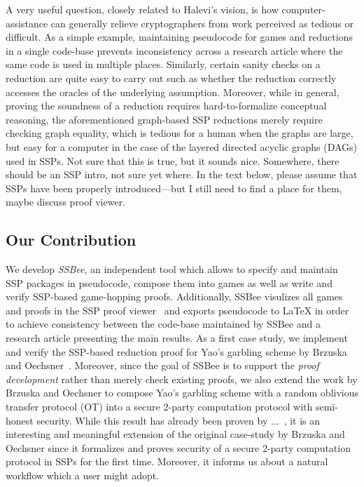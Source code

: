 {A very useful question, closely related to Halevi's vision, is how
computer-assistance can generally relieve cryptographers from work perceived 
as tedious or difficult. %
As a simple example, maintaining pseudocode for games and reductions in a single 
code-base prevents inconsistency across a research article where the same code
is used in multiple places. Similarly, certain sanity checks on a reduction
are quite easy to carry out such as whether the reduction correctly accesses the
oracles of the underlying assumption. Moreover, while in general, proving the soundness of a reduction requires hard-to-formalize conceptual reasoning, the aforementioned graph-based SSP reductions merely require checking graph equality,
which is tedious for a human when the graphs are large, but easy for a computer in the case of the layered directed acyclic graphs (DAGs) used in SSPs. {\color{blue} Not sure that this is true, but it sounds nice. Somewhere, there should be an SSP intro, not sure yet where. In the text below, please assume that SSPs have been properly introduced---but I still need to find a place for them, maybe discuss proof viewer.}
\fi

\subsection{Our Contribution}
We develop \emph{SSBee}, an independent tool which allows to specify and maintain
SSP packages in pseudocode, compose them into games as well as write and verify
SSP-based game-hopping proofs. Additionally, SSBee visulizes all games and proofs in the SSP proof viewer~\cite{X} and exports pseudocode to LaTeX in order to achieve consistency between the code-base maintained by SSBee and a research article
presenting the main results. As a first case study, we implement and verify the SSP-based reduction proof for Yao's garbling scheme by Brzuska and Oechsner~\cite{X}. Moreover, since the goal of SSBee is to support the \emph{proof development} rather than merely check existing proofs, we also extend the work by Brzuska and Oechsner to compose Yao's garbling scheme with a random oblivious transfer protocol (OT) into a secure 2-party computation protocol with semi-honest security. While this result has already been proven by ...~\cite{X}, it is an interesting and meaningful extension of the original case-study by Brzuska and Oechsner since it formalizes and proves security of a secure 2-party computation protocol in SSPs for the first time. Moreover, it informs us about a natural workflow which a user might adopt.

}
